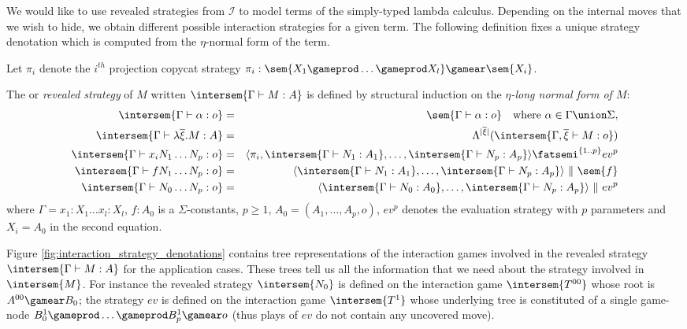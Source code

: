 We would like to use revealed strategies from $\mathcal{I}$ to model terms of
the simply-typed lambda calculus.
Depending on the internal moves that we wish to hide, we obtain different possible interaction strategies for a given term.
The following definition fixes a unique strategy denotation which is computed from the $\eta$-normal form of the term.

\begin{definition}
\label{dfn:interactionstrategy_ofterms} Let $\pi_i$ denote the
$i^{th}$ projection copycat strategy $\pi_i : \sem{X_1 \gameprod
\ldots \gameprod X_l} \gamear \sem{X_i}$.

The  or \emph{revealed strategy} of
$M$ written $\intersem{\Gamma \vdash M : A}$ is defined by structural induction on the \emph{$\eta$-long normal form of $M$}:
\begin{eqnarray*}
\intersem{\Gamma \vdash \alpha : o} &=&
\sem{\Gamma \vdash \alpha : o} \quad \mbox{where } \alpha \in \Gamma \union \Sigma,\\
\intersem{\Gamma \vdash \lambda \overline{\xi} . M  : A} &=& \Lambda^{|\overline{\xi}|}(\intersem{\Gamma, \overline{\xi} \vdash M : o })  \\
\intersem{\Gamma  \vdash x_i N_1 \ldots N_p :o} &=& \langle \pi_i, \intersem{\Gamma \vdash N_1 : A_1}, \ldots, \intersem{\Gamma \vdash N_p : A_p}  \rangle \fatsemi ^{\{1..p\}} ev^p \\
\intersem{\Gamma \vdash f N_1 \ldots N_p : o} &=& \langle \intersem{\Gamma \vdash N_1 : A_1}, \ldots, \intersem{\Gamma \vdash N_p : A_p} \rangle\ \|\ \sem{f} \\
\intersem{\Gamma \vdash N_0 \ldots N_p : o} &=& \langle \intersem{\Gamma \vdash N_0 : A_0}, \ldots, \intersem{\Gamma \vdash N_p : A_p}  \rangle\ \|\ ev^p
\end{eqnarray*}
where $\Gamma = x_1 : X_1 \ldots x_l : X_l$, $f : A_0$ is a $\Sigma$-constants, $p\geq 1$, $A_0 =
(A_1,\ldots,A_p,o)$, $ev^p$ denotes the evaluation strategy with
$p$ parameters and $X_i = A_0$ in the second equation.
\end{definition}

Figure \ref{fig:interaction_strategy_denotations} contains tree representations of the interaction games involved in the revealed strategy $\intersem{\Gamma \vdash M : A}$ for the application cases. These trees tell us all the information that we need about the strategy involved in $\intersem{M}$. For instance the revealed strategy $\intersem{N_0}$ is defined on the interaction game $\intersem{T^{00}}$ whose root is $A^{00} \gamear B_0$; the strategy $ev$ is defined on the interaction game $\intersem{T^1}$ whose underlying tree is constituted of a single game-node $B_0^1 \gameprod \ldots \gameprod B_p^1 \gamear o$ (thus plays of $ev$ do not contain any uncovered move).


